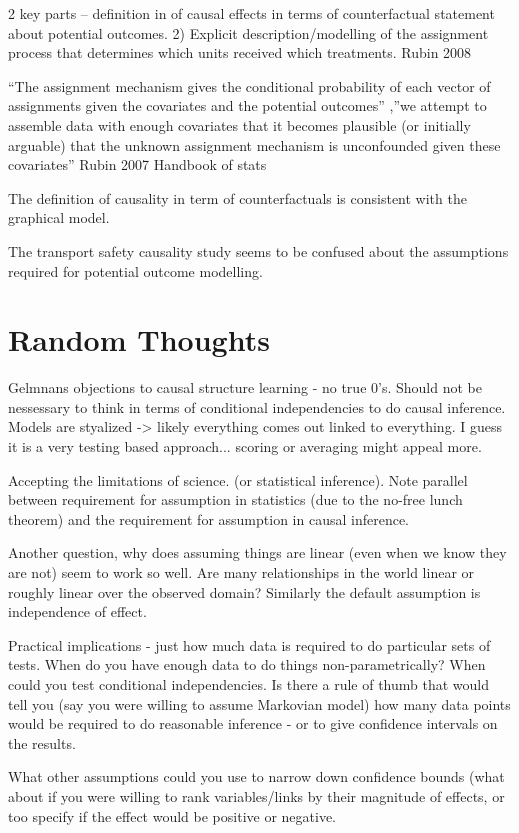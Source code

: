 \documentclass[11pt,a4paper]{article}
\begin{document}
2 key parts – definition in of causal effects in terms of counterfactual statement about potential outcomes. 2) Explicit description/modelling of the assignment process that determines which units received which treatments. Rubin 2008

“The assignment mechanism gives the conditional probability of each vector of assignments given the covariates and the potential outcomes” ,”we attempt to assemble data with 
enough covariates that it becomes plausible (or initially arguable) that the 
unknown assignment mechanism is unconfounded given these covariates” 
Rubin 2007 Handbook of stats

The definition of causality in term of counterfactuals is consistent with the graphical model.


The transport safety causality study seems to be confused about the assumptions required for potential outcome modelling. 


\section*{Random Thoughts}
Gelmnans objections to causal structure learning - no true 0's. Should not be nessessary to think in terms of conditional independencies to do causal inference. Models are styalized -> likely everything comes out linked to everything. I guess it is a very testing based approach... scoring or averaging might appeal more. 

Accepting the limitations of science. (or statistical inference). Note parallel between requirement for assumption in statistics (due to the no-free lunch theorem) and the requirement for assumption in causal inference.

Another question, why does assuming things are linear (even when we know they are not) seem to work so well. Are many relationships in the world linear or roughly linear over the observed domain? Similarly the default assumption is independence of effect. 

Practical implications - just how much data is required to do particular sets of tests. When do you have enough data to do things non-parametrically? When could you test conditional independencies. Is there a rule of thumb that would tell you (say you were willing to assume Markovian model) how many data points would be required to do reasonable inference - or to give confidence intervals on the results. 

What other assumptions could you use to narrow down confidence bounds (what about if you were willing to rank variables/links by their magnitude of effects, or too specify if the effect would be positive or negative. 
\end{document}
